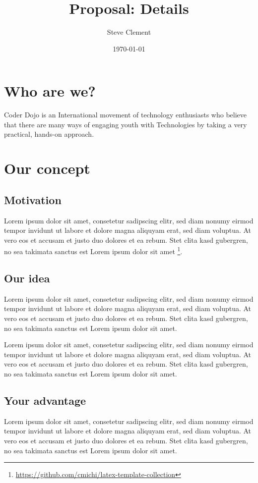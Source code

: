 \documentclass{application}
\title{Proposal: Details}
\author{Steve Clement}
\date{\today}
\begin{document}
\newpage

\maketitle

\newpage


\section*{Who are we?}

Coder Dojo is an International movement of technology enthusiasts who believe that there are many ways of engaging youth with Technologies by taking a very practical, hands-on approach.


\section*{Our concept}

\subsection*{Motivation}
Lorem ipsum dolor sit amet, consetetur sadipscing elitr, sed diam nonumy
eirmod tempor invidunt ut labore et dolore magna aliquyam erat, sed diam
voluptua. At vero eos et accusam et justo duo dolores et ea rebum. Stet
clita kasd gubergren, no sea takimata sanctus est Lorem ipsum dolor sit
amet \footnote{\url{https://github.com/cmichi/latex-template-collection}}.

\subsection*{Our idea}
Lorem ipsum dolor sit amet, consetetur sadipscing elitr, sed diam nonumy
eirmod tempor invidunt ut labore et dolore magna aliquyam erat, sed diam
voluptua. At vero eos et accusam et justo duo dolores et ea rebum. Stet
clita kasd gubergren, no sea takimata sanctus est Lorem ipsum dolor sit
amet.

Lorem ipsum dolor sit amet, consetetur sadipscing elitr, sed diam nonumy
eirmod tempor invidunt ut labore et dolore magna aliquyam erat, sed diam
voluptua. At vero eos et accusam et justo duo dolores et ea rebum. Stet
clita kasd gubergren, no sea takimata sanctus est Lorem ipsum dolor sit
amet.

\subsection*{Your advantage}
Lorem ipsum dolor sit amet, consetetur sadipscing elitr, sed diam nonumy
eirmod tempor invidunt ut labore et dolore magna aliquyam erat, sed diam
voluptua. At vero eos et accusam et justo duo dolores et ea rebum. Stet
clita kasd gubergren, no sea takimata sanctus est Lorem ipsum dolor sit
amet.
\end{document}
